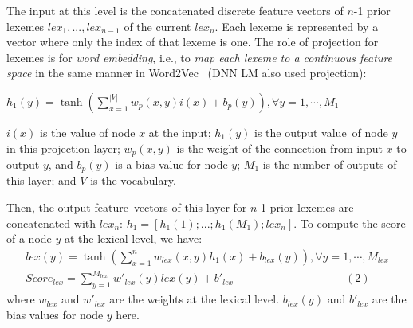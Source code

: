 

 The input at this level is the
concatenated discrete feature vectors of $n$-1 prior lexemes $lex_1,
..., lex_{n-1}$ of the current $lex_n$.
%
Each lexeme is represented by a vector where only the index of that
lexeme is one.
The role of projection for lexemes is for {\em word embedding}, i.e.,
to {\em map each lexeme to a continuous feature space} in the same manner in
Word2Vec~\cite{word2vec} (DNN LM also used projection):

${h_1}(y) = \tanh \left( {\sum\limits_{x = 1}^{|V|} {w_p(x,y)i(x)} +
  b_p(y)}\right),\forall y = 1, \cdots ,{M_1}$ 


\noindent $i(x)$ is the value of node $x$ at the input; $h_1(y)$ is
the output value~of node $y$ in this projection layer; $w_p(x,y)$ is
the weight of the connection from input $x$ to output $y$, and
$b_p(y)$ is a bias value for node $y$; $M_1$ is the number of outputs
of this layer; and $V$ is the vocabulary.



Then, the output feature~vectors of this layer for $n$-1 prior lexemes
are concatenated with $lex_n$: $h_1 = [h_1(1);...; h_1(M_1);lex_n]$.
To compute the score of a node $y$ at the lexical level, we have:
\[\begin{array}{l}
{lex}(y) = \tanh \left( {\sum\limits_{x = 1}^{n} {w_{lex}(x,y){h_1}(x)} + b_{lex}(y) }\right),\forall y = 1, \cdots ,{M_{lex}}\\
Score_{lex} = \sum\limits_{y = 1}^{{M_{lex}}} {w'_{lex}(y){lex}(y) + b'_{lex}}  \quad \quad \quad \quad \quad \quad \quad \quad \quad \quad (2)
\end{array}\]
where $w_{lex}$ and $w'_{lex}$ are the weights at the lexical
level. $b_{lex}(y)$ and $b'_{lex}$ are the bias values for node $y$ here.


